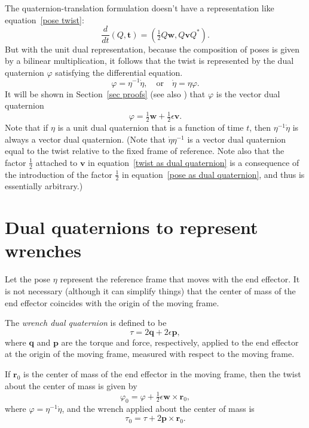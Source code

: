 \documentclass[reqno,12pt]{amsart}
\begin{document}
The quaternion-translation formulation doesn't have a representation like equation~\eqref{pose twist}:
\begin{equation}
\frac d{dt} (Q, \bm t) = \left(\tfrac12 Q \bm w, Q \bm v Q^* \right).
\end{equation}
But with the unit dual representation, because the composition of poses is given by a bilinear multiplication, it follows that the twist is represented by the dual quaternion $\varphi$ satisfying the differential equation.
\begin{equation}
\label{ode dual quaternion}
\varphi = \eta^{-1} \dot \eta, \quad\text{or}\quad\dot \eta = \eta \varphi .
\end{equation}
It will be shown in Section~\ref{sec proofs} (see also \cite{han-et-al,wang-et-al}) that $\varphi$ is the vector dual quaternion
\begin{equation}
\label{twist as dual quaternion}
\varphi = \tfrac12 \bm w + \tfrac12 \epsilon \bm v .
\end{equation}
Note that if $\eta$ is a unit dual quaternion that is a function of time $t$, then $\eta^{-1} \dot \eta$ is always a vector dual quaternion.  (Note that $\dot\eta\eta^{-1}$ is a vector dual quaternion equal to the twist relative to the fixed frame of reference.  Note also that the factor $\tfrac12$ attached to $\bm v$ in equation~\eqref{twist as dual quaternion} is a consequence of the introduction of the factor $\tfrac12$ in equation~\eqref{pose as dual quaternion}, and thus is essentially arbitrary.)

\section{Dual quaternions to represent wrenches}

Let the pose $\eta$ represent the reference frame that moves with the end effector.  It is not necessary (although it can simplify things) that the center of mass of the end effector coincides with the origin of the moving frame.

The \emph{wrench dual quaternion} is defined to be
\begin{equation}
\label{wrench as quaternion}
\tau = 2 \bm q + 2 \epsilon \bm p,
\end{equation}
where $\bm q$ and $\bm p$ are the torque and force, respectively, applied to the end effector at the origin of the moving frame, measured with respect to the moving frame.

If $\bm r_0$ is the center of mass of the end effector in the moving frame, then the twist about the center of mass is given by
\begin{equation}
\label{twist correction}
\varphi_0 = 
\varphi + \tfrac12\epsilon\bm w \times \bm r_0,
\end{equation}
where $\varphi = \eta^{-1} \dot \eta$, and the wrench applied about the center of mass is
\begin{equation}
\label{torque correction}
\tau_0 = 
\tau + 2 \bm p \times \bm r_0.
\end{equation}
\end{document}
